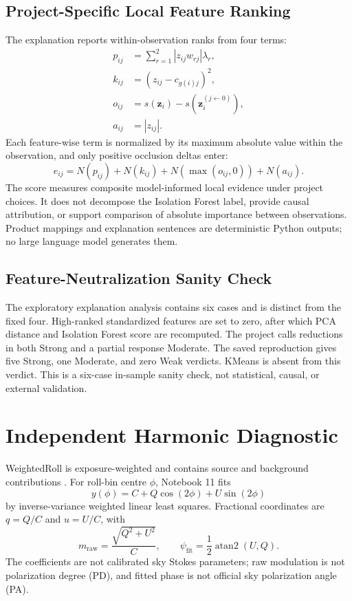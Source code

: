 \documentclass[conference]{IEEEtran}
\begin{document}
\subsection{Project-Specific Local Feature Ranking}
The explanation reports within-observation ranks from four terms:
\begin{align}
p_{ij}&=\sum_{r=1}^{2}|z_{ij}w_{rj}|\lambda_r,\\
k_{ij}&=(z_{ij}-c_{g(i)j})^2,\\
o_{ij}&=s(\mathbf{z}_i)-s(\mathbf{z}_i^{(j\leftarrow0)}),\\
a_{ij}&=|z_{ij}|.
\end{align}
Each feature-wise term is normalized by its maximum absolute value within the observation, and only positive occlusion deltas enter:
\begin{equation}
e_{ij}=N(p_{ij})+N(k_{ij})+N(\max(o_{ij},0))+N(a_{ij}).
\end{equation}
The score measures composite model-informed local evidence under project choices. It does not decompose the Isolation Forest label, provide causal attribution, or support comparison of absolute importance between observations. Product mappings and explanation sentences are deterministic Python outputs; no large language model generates them.

\subsection{Feature-Neutralization Sanity Check}
The exploratory explanation analysis contains six cases and is distinct from the fixed four. High-ranked standardized features are set to zero, after which PCA distance and Isolation Forest score are recomputed. The project calls reductions in both Strong and a partial response Moderate. The saved reproduction gives five Strong, one Moderate, and zero Weak verdicts. KMeans is absent from this verdict. This is a six-case in-sample sanity check, not statistical, causal, or external validation.

\section{Independent Harmonic Diagnostic}
WeightedRoll is exposure-weighted and contains source and background contributions \cite{polix_handbook_2025}. For roll-bin centre $\phi$, Notebook 11 fits
\begin{equation}
y(\phi)=C+Q\cos(2\phi)+U\sin(2\phi)
\end{equation}
by inverse-variance weighted linear least squares. Fractional coordinates are $q=Q/C$ and $u=U/C$, with
\begin{equation}
m_{\mathrm{raw}}=\frac{\sqrt{Q^2+U^2}}{C},\qquad
\psi_{\mathrm{fit}}=\frac{1}{2}\operatorname{atan2}(U,Q).
\end{equation}
The coefficients are not calibrated sky Stokes parameters; raw modulation is not polarization degree (PD), and fitted phase is not official sky polarization angle (PA).
\end{document}
